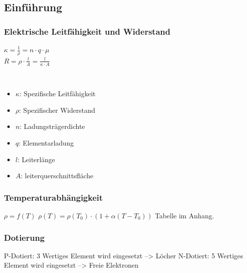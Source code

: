 \documentclass[margin=normal]{tex/hsrzf}
\begin{document}
\subsection{Einführung}
\begin{multicols}{2}
  \subsubsection*{Elektrische Leitfähigkeit und Widerstand}
  $\kappa = \frac{1}{\rho} = n \cdot q \cdot \mu$
  \\$R = \rho \cdot \frac{l}{A} = \frac{l}{\kappa \cdot A} $
    {\\ \tiny \begin{itemize}[leftmargin=*]
          \item $\kappa$: Spezifische Leitfähigkeit
          \item $\rho$: Spezifischer Widerstand
          \item $n$: Ladungsträgerdichte
          \item $q$: Elementarladung
          \item $l$: Leiterlänge
          \item $A$: leiterquerschnittsfläche
        \end{itemize}}

    \subsubsection*{Temperaturabhängigkeit}
  $\rho = f(T)$
    \newline$\rho(T) = \rho(T_0) \cdot (1+ \alpha(T-T_0))$
  {\newline \tiny Tabelle im Anhang.}

  \subsubsection{Dotierung}
  {\tiny P-Dotiert: 3 Wertiges Element wird eingesetzt --> Löcher}
  \newline
  {\tiny N-Dotiert: 5 Wertiges Element wird eingesetzt --> Freie Elektronen}
\end{multicols}
\end{document}
